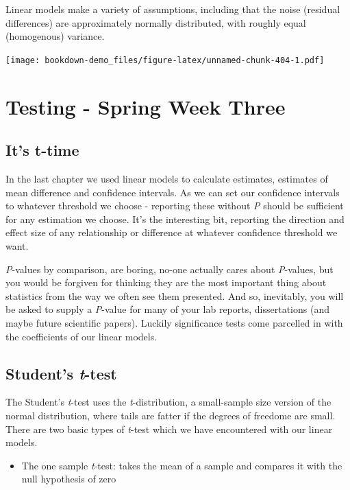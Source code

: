 \documentclass[
]{book}
\providecommand{\tightlist}{%
  \setlength{\itemsep}{0pt}\setlength{\parskip}{0pt}}
\begin{document}
Linear models make a variety of assumptions, including that the noise (residual differences) are approximately normally distributed, with roughly equal (homogenous) variance.

\texttt{[image: bookdown-demo\_files/figure-latex/unnamed-chunk-404-1.pdf]}

\hypertarget{testing---spring-week-three}{%
\chapter{Testing - Spring Week Three}\label{testing---spring-week-three}}

\hypertarget{its-t-time}{%
\section{It's t-time}\label{its-t-time}}

In the last chapter we used linear models to calculate estimates, estimates of mean difference and confidence intervals. As we can set our confidence intervals to whatever threshold we choose - reporting these without \emph{P} should be sufficient for any estimation we choose. It's the interesting bit, reporting the direction and effect size of any relationship or difference at whatever confidence threshold we want.

\emph{P}-values by comparison, are boring, no-one actually cares about \emph{P}-values, but you would be forgiven for thinking they are the most important thing about statistics from the way we often see them presented. And so, inevitably, you will be asked to supply a \emph{P}-value for many of your lab reports, dissertations (and maybe future scientific papers). Luckily significance tests come parcelled in with the coefficients of our linear models.

\hypertarget{students-t-test}{%
\section{\texorpdfstring{Student's \emph{t}-test}{Student's t-test}}\label{students-t-test}}

The Student's \emph{t}-test uses the \emph{t}-distribution, a small-sample size version of the normal distribution, where tails are fatter if the degrees of freedome are small. There are two basic types of \emph{t}-test which we have encountered with our linear models.

\begin{itemize}
\tightlist
\item
  The one sample \emph{t}-test: takes the mean of a sample and compares it with the null hypothesis of zero
\end{itemize}
\end{document}

